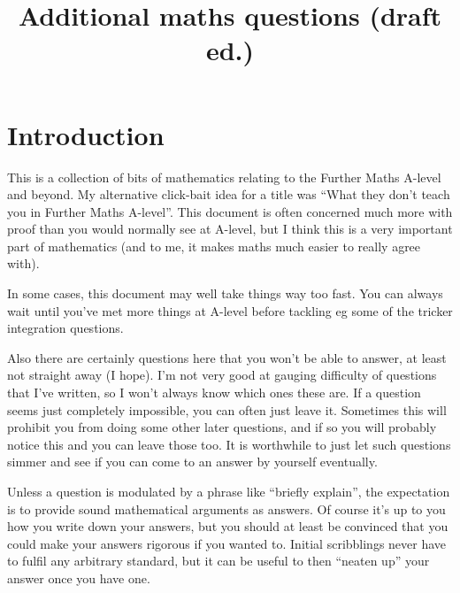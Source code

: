 \documentclass[fleqn,a4paper,11pt]{article}
\date{}
\author{}
\title{Additional maths questions (draft ed.)}
\begin{document}
\maketitle
\tableofcontents

\section{Introduction}

This is a collection of bits of mathematics relating to the Further Maths
A-level and beyond. My alternative click-bait idea for a title was ``What they
don't teach you in Further Maths A-level''. This document is often concerned
much more with proof than you would normally see at A-level, but I think this is
a very important part of mathematics (and to me, it makes maths much easier to
really agree with).

In some cases, this document may well take things way too fast. You can always
wait until you've met more things at A-level before tackling eg some of the
tricker integration questions.

Also there are certainly questions here that you won't be able to answer, at
least not straight away (I hope). I'm not very good at gauging difficulty of
questions that I've written, so I won't always know which ones these are. If a
question seems just completely impossible, you can often just leave it.
Sometimes this will prohibit you from doing some other later questions, and if
so you will probably notice this and you can leave those too. It is worthwhile
to just let such questions simmer and see if you can come to an answer by
yourself eventually.

Unless a question is modulated by a phrase like ``briefly explain'', the
expectation is to provide sound mathematical arguments as answers. Of course
it's up to you how you write down your answers, but you should at least be
convinced that you could make your answers rigorous if you wanted to. Initial
scribblings never have to fulfil any arbitrary standard, but it can be useful to
then ``neaten up'' your answer once you have one.









\end{document}
